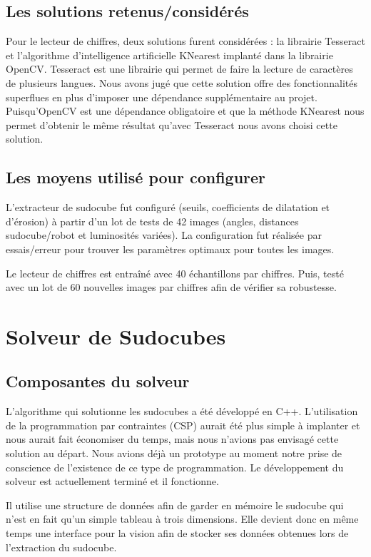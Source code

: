 \subsection{Les solutions retenus/considérés}
Pour le lecteur de chiffres, deux solutions furent considérées : la librairie Tesseract et l'algorithme d'intelligence artificielle KNearest implanté dans la librairie OpenCV. Tesseract est une librairie qui permet de faire la lecture de caractères de plusieurs langues. Nous avons jugé que cette solution offre des fonctionnalités superflues en plus d'imposer une dépendance supplémentaire au projet. Puisqu’OpenCV est une dépendance obligatoire et que la méthode KNearest nous permet d'obtenir le même résultat qu'avec Tesseract nous avons choisi cette solution.

\subsection{Les moyens utilisé pour configurer}
L'extracteur de sudocube fut configuré (seuils, coefficients de dilatation et d'érosion) à partir d'un lot de tests de 42 images (angles, distances sudocube/robot et luminosités variées). La configuration fut réalisée par essais/erreur pour trouver les paramètres optimaux pour toutes les images.

Le lecteur de chiffres est entraîné avec 40 échantillons par chiffres. Puis, testé avec un lot de 60 nouvelles images par chiffres afin de vérifier sa robustesse.

\section{Solveur de Sudocubes}
\subsection{Composantes du solveur}
L'algorithme qui solutionne les sudocubes a été développé en C++. L'utilisation de la programmation par contraintes (CSP) aurait été  plus simple à implanter et nous aurait fait économiser du temps, mais nous n'avions pas envisagé cette solution au départ. Nous avions déjà un prototype au moment notre prise de conscience de l'existence de ce type de programmation. Le développement du solveur est actuellement terminé et il fonctionne.

Il utilise une structure de données afin de garder en mémoire le sudocube qui n'est en fait qu'un simple tableau à trois dimensions. Elle devient donc en même temps une interface pour la vision afin de stocker ses données obtenues lors de l'extraction du sudocube.


